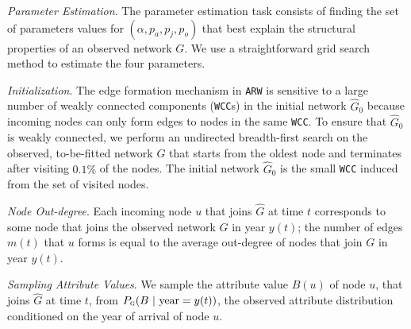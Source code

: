 \textit{Parameter Estimation}.
The parameter estimation task consists of finding the set of
parameters values for $(\alpha, p_a, p_j, p_o)$ that best explain the structural properties
of an observed network $G$. We use a straightforward grid search method to estimate
the four parameters.

\textit{Initialization}. The edge formation mechanism in \texttt{ARW} is
sensitive to a large number of weakly connected components (\texttt{WCC}s) in the
initial network $\hat{G}_0$ because incoming nodes can only form edges to nodes
in the same \texttt{WCC}. To ensure that $\hat{G}_0$ is weakly
connected, we perform an undirected breadth-first search on the observed,
to-be-fitted network $G$ that starts from the oldest node and terminates after
visiting $0.1\%$ of the nodes. The initial network $\hat{G}_0$ is the small \texttt{WCC}
induced from the set of visited nodes.


\textit{Node Out-degree}.
Each incoming node $u$ that joins $\hat{G}$ at time $t$ corresponds to some
node that joins the observed network $G$ in year $y(t)$; the number of edges $m(t)$
that $u$ forms is equal to the average out-degree of nodes that join $G$ in year $y(t)$.

\textit{Sampling Attribute Values}.
We sample the attribute value $B(u)$ of node $u$, that
joins $\hat{G}$ at time $t$, from $P_{\textsc{g}}(B{\mbox{ | year}=y(t)})$, the observed attribute distribution conditioned on the year of arrival of node $u$.

